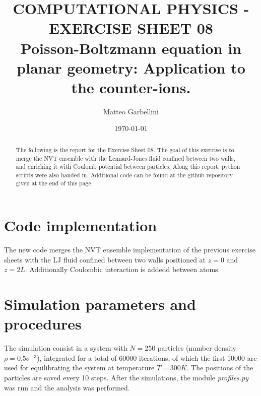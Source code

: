 \documentclass[aps,pra,reprint, onecolumn, rmp]{revtex4-2}
\begin{document}
\title{COMPUTATIONAL PHYSICS - EXERCISE SHEET 08 \\Poisson-Boltzmann equation in planar geometry: Application to the counter-ions.}

\author{Matteo Garbellini}


\date{\today}

\begin{abstract}
The following is the report for the Exercise Sheet 08. The goal of this exercise is to merge the NVT ensemble with the Lennard-Jones fluid confined between two walls, and enriching it with Coulomb potential between particles. Along this report, python scripts were also handed in. Additional code can be found at the github repository given at the end of this page. 
\end{abstract}


\maketitle

\section{Code implementation}
The new code merges the NVT ensemble implementation of the previous exercise sheets with the LJ fluid confined between two walls positioned at $z=0$ and $z=2L$. Additionally Coulombic interaction is addedd between atoms.

\section{Simulation parameters and procedures}
The simulation consist in a system with $N = 250 $ particles (number density $\rho = 0.5 \sigma^{-3}$), integrated for a total of 60000 iterations, of which the first 10000 are used for equilibrating the system at temperature $T=300K$. The positions of the particles are saved every 10 steps.
After the simulations, the module \textit{profiles.py} was run and the analysis was performed.
\end{document}
